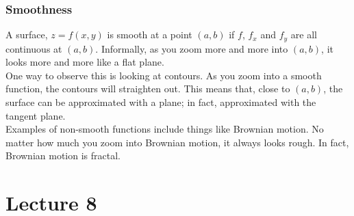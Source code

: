 \documentclass{report}
\begin{document}

\subsubsection*{Smoothness}
A surface, $z = f(x,y)$ is smooth at a point $(a,b)$ if $f$, $f_x$ and $f_y$ are all continuous at $(a,b)$. Informally, as you zoom more and more into $(a,b)$, it looks more and more like a flat plane.\\
One way to observe this is looking at contours. As you zoom into a smooth function, the contours will straighten out. This means that, close to $(a,b)$, the surface can be approximated with a plane; in fact, approximated with the tangent plane.\\
Examples of non-smooth functions include things like Brownian motion. No matter how much you zoom into Brownian motion, it always looks rough. In fact, Brownian motion is fractal.

\section{Lecture 8}
\end{document}
